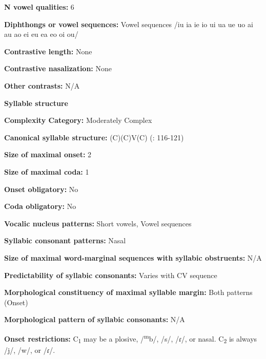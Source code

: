 \textbf{N vowel qualities:} 6



\textbf{Diphthongs or vowel sequences:} Vowel sequences /iu ia ie io ui ua ue uo ai au ao ei eu ea eo oi ou/



\textbf{Contrastive length:} None



\textbf{Contrastive nasalization:} None



\textbf{Other contrasts:} N/A



\textbf{Syllable structure}



\textbf{Complexity Category:} Moderately Complex



\textbf{Canonical syllable structure:} (C)(C)V(C) (\citealt{SandersSanders1980}: 116-121)



\textbf{Size of maximal onset:} 2



\textbf{Size of maximal coda:} 1



\textbf{Onset obligatory:} No



\textbf{Coda obligatory:} No



\textbf{Vocalic nucleus patterns:} Short vowels, Vowel sequences



\textbf{Syllabic consonant patterns:} Nasal



\textbf{Size of maximal word{}-marginal sequences with syllabic obstruents:} N/A



\textbf{Predictability of syllabic consonants:} Varies with CV sequence



\textbf{Morphological constituency of maximal syllable margin:} Both patterns (Onset)



\textbf{Morphological pattern of syllabic consonants:} N/A



\textbf{Onset restrictions:} C\textsubscript{1} may be a plosive, /\textsuperscript{m}b/, /s/, /ɾ/, or nasal. C\textsubscript{2} is always /j/, /w/, or /ɾ/.



